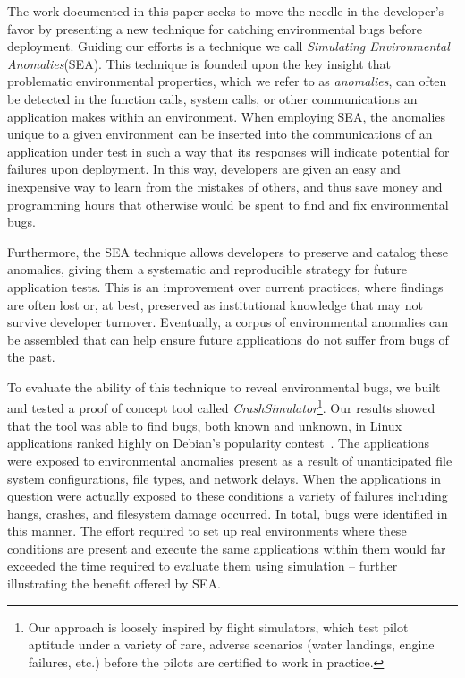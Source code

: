 The work documented in this paper
seeks to move the needle in the developer's favor
by presenting a new technique for catching environmental bugs
before deployment.
Guiding our efforts
is a technique
we call \textit{Simulating Environmental Anomalies}(SEA).
This technique is founded upon the key insight
that problematic environmental properties,
which we refer to as \textit{anomalies},
can often be detected
in the function calls,
system calls,
or other communications an application makes within an environment.
When employing SEA,
the anomalies
unique to a given environment
can be inserted into
the communications of an application under test
in such a way
that its responses will indicate potential
for failures upon deployment.
In this way,
developers are given
an easy and inexpensive way
to learn from the mistakes of others,
and thus save money and programming hours
that otherwise would be spent to find and fix
environmental bugs.

Furthermore,
the SEA technique
allows developers to preserve and catalog
these anomalies,
giving them a systematic and reproducible strategy for future application
tests.
This is an improvement over current practices,
where findings are often lost or,
at best, preserved as
institutional knowledge
that may not survive developer turnover.
Eventually,
a corpus of environmental anomalies can be assembled
that can help ensure
future applications do not suffer from bugs of the past.

To evaluate the ability of this technique to reveal environmental
bugs, we built and tested a proof of concept tool
called {\em CrashSimulator}\footnote{Our approach is
loosely inspired by flight simulators, which test pilot aptitude under a
variety of rare, adverse scenarios (water landings, engine failures, etc.)
before the pilots are certified to work in practice.}.
Our results showed that the tool was able to find bugs,
both known and unknown,
in Linux applications ranked highly on Debian's popularity
contest~\cite{DebPopCon}.
The applications were exposed
to environmental anomalies present as a result of unanticipated
file system configurations, file types, and network delays.
When the applications in
question were actually exposed to these conditions a variety of failures
including hangs, crashes, and filesystem damage occurred.  In total,
bugs were identified in this manner.
The effort required to set up real
environments where these conditions are present
and execute the same applications within them
would far exceeded the time required to evaluate them
using simulation -- further illustrating the benefit offered by SEA.

